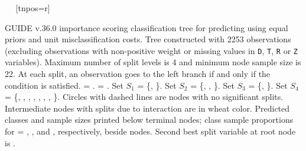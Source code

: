 \documentclass{article}
\begin{document}
\begin{landscape}
\begin{center}
{{{{    ~{}
    ~[tnpos=r]{}
    ~{}
 }
 }
 }
 }
 \end{center}
GUIDE v.36.0 importance scoring
classification tree for predicting \texttt{} using
equal priors
and unit misclassification costs.
 Tree constructed with 2253 observations
 (excluding observations with non-positive weight or missing values
 in \texttt{D}, \texttt{T}, \texttt{R} or \texttt{Z} variables).
 Maximum number of split levels is 4 and minimum node sample size is 22.
At each split, an observation goes to the left branch 
 if and only if the condition is satisfied.
\texttt{} = \texttt{}.
\texttt{} = \texttt{}.
 Set $S_{1}$ = \{\texttt{}, \texttt{}\}.
 Set $S_{2}$ = \{\texttt{}, \texttt{},
 \texttt{}\}.
 Set $S_{3}$ = \{\texttt{}, \texttt{}\}.
 Set $S_{4}$ = \{\texttt{}, \texttt{},
 \texttt{}, \texttt{}, \texttt{},
 \texttt{}, \texttt{}, \texttt{}\}.
 Circles with dashed lines are nodes with no significant splits.
 Intermediate nodes with splits due to interaction are in wheat color.
Predicted classes and sample sizes printed below terminal nodes;
class sample proportions for \texttt{} =
 \texttt{}, \texttt{}, and \texttt{}, respectively, beside nodes.
Second best split variable at root node is \texttt{}.
 \end{landscape}
 
\end{document}
